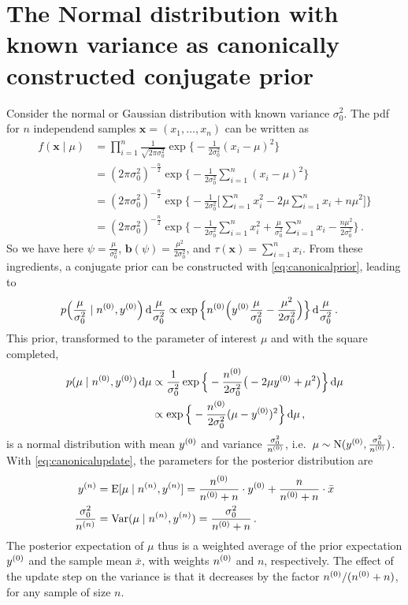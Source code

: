 \documentclass[12pt,a4paper	,twoside]{article}
\newcommand{\dd}{\,\mathrm{d}}
\newcommand{\mbf}[1]{\mathbf{#1}}
\newcommand{\bs}[1]{\boldsymbol{#1}}
\renewcommand{\vec}[1]{{\bs#1}}
\newcommand{\E}{\operatorname{E}}
\newcommand{\V}{\operatorname{Var}}
\newcommand{\norm}{\operatorname{N}}
\begin{document}
\appendix

\section{The Normal distribution with known variance as canonically constructed conjugate prior}
\label{sec:scalednormalconstruction}

Consider the normal or Gaussian distribution with known variance $\sigma^2_0$.
The pdf for $n$ independend samples $\vec{x} = (x_1,\ldots,x_n)$
can be written as
\begin{align}
\label{eq:normaldens}
f(\vec{x}\mid\mu)
 &= \prod_{i=1}^n \frac{1}{\sqrt{2\pi\sigma_0^2}} \exp\Big\{ -\frac{1}{2\sigma_0^2} (x_{i} - \mu)^2 \Big\} \nonumber\\
 &= (2\pi\sigma_0^2)^{-\frac{n}{2}}\exp\Big\{ -\frac{1}{2\sigma_0^2} \sum_{i=1}^n (x_{i} - \mu)^2 \Big\} \\
 &= (2\pi\sigma_0^2)^{-\frac{n}{2}}
    \exp\Big\{ -\frac{1}{2\sigma_0^2} \Big[ \sum_{i=1}^n x_{i}^2 -2\mu\sum_{i=1}^n x_{i} + n\mu^2 \Big] \Big\} \nonumber\\
 &= (2\pi\sigma_0^2)^{-\frac{n}{2}}
    \exp\Big\{ -\frac{1}{2\sigma_0^2} \sum_{i=1}^n x_{i}^2 +\frac{\mu}{\sigma_0^2} \sum_{i=1}^n x_{i} - \frac{n \mu^2}{2\sigma_0^2} \Big\}\,.
\end{align}
So we have here $\psi = \frac{\mu}{\sigma_0^2}$, $\mbf{b}(\psi) = \frac{\mu^2}{2\sigma_0^2}$, and $\tau(\vec{x}) = \sum_{i=1}^n x_i$.
From these ingredients, a conjugate prior can be constructed with \eqref{eq:canonicalprior}, leading to
\begin{align}
p\Big(\frac{\mu}{\sigma_0^2} \mid \nz, \yz\Big) \dd\frac{\mu}{\sigma_0^2}
 &\propto \exp\Big\{ \nz \Big(\yz \frac{\mu}{\sigma_0^2} - \frac{\mu^2}{2\sigma_0^2} \Big) \Big\} \dd\frac{\mu}{\sigma_0^2}\,.
\end{align}
This prior, transformed to the parameter of interest $\mu$ and with the square completed,
\begin{align}
p(\mu \mid \nz, \yz) \dd\mu
 &\propto \frac{1}{\sigma_0^2} \exp\Big\{ -\frac{\nz}{2\sigma_0^2} \big(-2\mu\yz + \mu^2\big)\Big\} \dd\mu \nonumber\\
 &\propto \exp\Big\{ -\frac{\nz}{2\sigma_0^2} (\mu - \yz)^2 \Big\} \dd\mu\,,
\end{align}
is a normal distribution with mean $y^{(0)}$ and variance $\frac{\sigma_0^2}{n^{(0)}}$,
i.e.\ $\mu \sim \norm(\yz, \frac{\sigma_0^2}{\nz})$.
With \eqref{eq:canonicalupdate}, the parameters for the posterior distribution are
\begin{align}
\yn &= \E[\mu\mid\nn, \yn] = \frac{\nz}{\nz + n} \cdot \yz + \frac{n}{\nz + n} \cdot \bar{x} \label{eq:normalposte}\\
\frac{\sigma_0^2}{\nn} &= \V(\mu\mid\nn, \yn) = \frac{\sigma_0^2}{\nz + n}\,. \label{eq:normalpostvar}
\end{align}
The posterior expectation of $\mu$ thus is a weighted average of the prior expectation $y^{(0)}$ and the sample mean $\bar{x}$,
with weights $n^{(0)}$ and $n$, respectively.
The effect of the update step on the variance is that it decreases by the factor $n^{(0)}/(n^{(0)}+n)$,
for any sample of size $n$.
\end{document}
